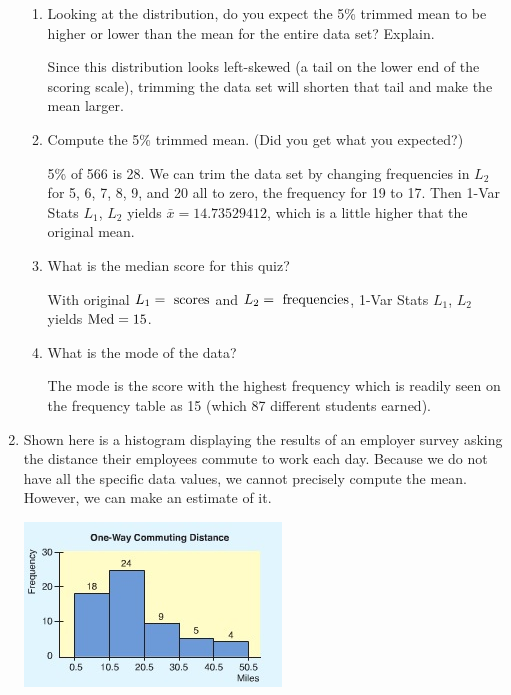 \documentclass{article}
\newcommand{\answer}[1]{\color{red}#1}
\begin{document}
\begin{enumerate}
\begin{enumerate}
	\item Looking at the distribution, do you expect the 5\% trimmed mean to be higher or lower than the mean for the entire data set?  Explain.
	
	{\answer{Since this distribution looks left-skewed (a tail on the lower end of the scoring scale), trimming the data set will shorten that tail and make the mean larger.}} 
	
	\item Compute the 5\% trimmed mean.  (Did you get what you expected?) 

	{\answer{5\% of 566 is 28.  We can trim the data set by changing frequencies in $L_2$ for 5, 6, 7, 8, 9, and 20 all to zero, the frequency for 19 to 17.  Then 1-Var Stats $L_1$, $L_2$ yields $\bar{x} = 14.73529412$, which is a little higher that the original mean.}} 

	\item What is the median score for this quiz? 

	{\answer{With original $L_1 = \textnormal{ scores}$ and $L_2 = \textnormal{ frequencies}$,
	1-Var Stats $L_1$, $L_2$ yields $\textnormal{Med} = 15$.}} 

	\item What is the mode of the data?
	
	{\answer{The mode is the score with the highest frequency which is readily seen on the frequency table as 15 (which 87 different students earned).}} 

	\end{enumerate}

\pagebreak

\item Shown here is a histogram displaying the results of an employer survey asking the distance their employees commute to work each day.  Because we do not have all the specific data values, we cannot precisely compute the mean.  However, we can make an estimate of it.
\begin{center}
\includegraphics[scale=0.75]{WS3_Commute.jpg}
\end{center}


\end{enumerate}
\end{document}
